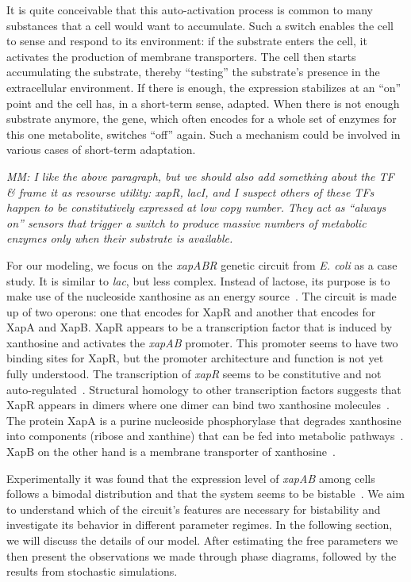 \documentclass[10pt,letterpaper]{article}
\begin{document}
It is quite conceivable that this auto-activation process is common to many
substances that a cell would want to accumulate. Such a switch enables the
cell to sense and respond to its environment: if the substrate enters the
cell, it activates the production of membrane transporters. The cell then
starts accumulating the substrate, thereby ``testing'' the substrate's
presence in the extracellular environment. If there is enough, the
expression stabilizes at an ``on'' point and the cell has, in a short-term
sense, adapted. When there is not enough substrate anymore, the gene, which
often encodes for a whole set of enzymes for this one metabolite, switches
``off'' again. Such a mechanism could be involved in various cases of
short-term adaptation.

\textit{MM: I like the above paragraph, but we should also add something
about the TF \& frame it as resourse utility: xapR, lacI, and I suspect
others of these TFs happen to be constitutively expressed at low copy
number. They act as ``always on'' sensors that trigger a switch to produce
massive numbers of metabolic enzymes only when their substrate is
available.}

For our modeling, we focus on the \emph{xapABR} genetic circuit from
\emph{E. coli} as a case study. It is similar to \emph{lac}, but less
complex. Instead of lactose, its purpose is to make use of the nucleoside
xanthosine as an energy source~\cite{Buxton1980,Hammer-Jespersen1980}. The
circuit is made up of two operons: one that encodes for XapR and another
that encodes for XapA and XapB. XapR appears to be a transcription factor
that is induced by xanthosine and activates the \emph{xapAB} promoter.
This promoter seems to have two binding sites for XapR, but the promoter
architecture and function is not yet fully understood. The
transcription of \emph{xapR} seems to be constitutive and not
auto-regulated~\cite{Seeger1995}. Structural homology to other transcription
factors suggests that XapR appears in dimers where one dimer can bind two
xanthosine molecules~\cite{Joergensen1999}. The protein XapA is a purine
nucleoside phosphorylase that degrades xanthosine into components (ribose
and xanthine) that can be fed into metabolic
pathways~\cite{Buxton1980,Hammer-Jespersen1980}. XapB on the other hand is a
membrane transporter of xanthosine~\cite{Seeger1995,Norholm2001}.

Experimentally it was found that the expression level of \emph{xapAB} among
cells follows a bimodal distribution and that the system seems to be
bistable~\cite{Chure2019}. We aim to understand which of the circuit's
features are necessary for bistability and investigate its behavior in
different parameter regimes. In the following section, we will discuss the
details of our model. After estimating the free parameters we then present
the observations we made through phase diagrams, followed by the results
from stochastic simulations.
\end{document}
